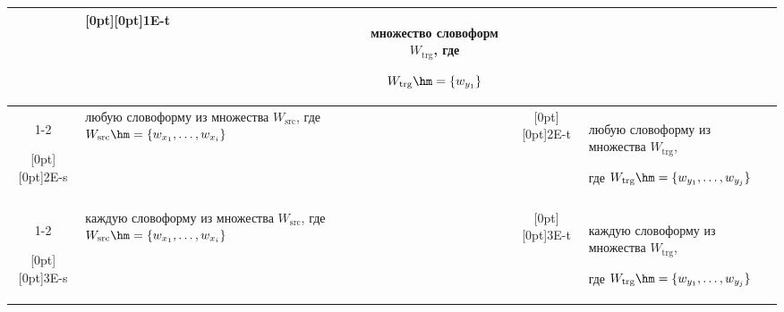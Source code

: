 \begin{table}
\begin{center}
\begin{tabular}{|c|p{43mm}|c|c|p{43mm}|}
{{{ }}}&\raisebox{-6pt}[0pt][0pt]{1E-t}&


множество словоформ $W_{\mathrm{trg}}$, где 


$W_{\mathrm{trg}}\hm=\{w_{y_1}\}$\\%


\cline{1-2}


\cline{4-5}


\raisebox{-10pt}[0pt][0pt]{2E-s}&любую словоформу из множества $W_{\mathrm{src}}$, где $W_{\mathrm{src}}\hm = \{ 


w_{x_1}, \ldots , w_{x_i}\}$&&


\raisebox{-10pt}[0pt][0pt]{2E-t}&любую словоформу из множества $W_{\mathrm{trg}}$, 


где $W_{\mathrm{trg}}\hm = \{w_{y_1}, \ldots , w_{y_j}\}$\\


&&&&\\[-9pt]


\cline{1-2}


\cline{4-5}


\raisebox{-10pt}[0pt][0pt]{3E-s}&каждую словоформу из множества $W_{\mathrm{src}}$, где $W_{\mathrm{src}}\hm = \{ 


w_{x_1}, \ldots , w_{x_i}\}$&&


\raisebox{-10pt}[0pt][0pt]{3E-t}&каждую словоформу из множества $W_{\mathrm{trg}}$, 


где $W_{\mathrm{trg}}\hm = \{w_{y_1}, \ldots , w_{y_j}\}$\\


\hline


\end{tabular}


\end{center}


\vspace*{-12pt}


\end{table}








